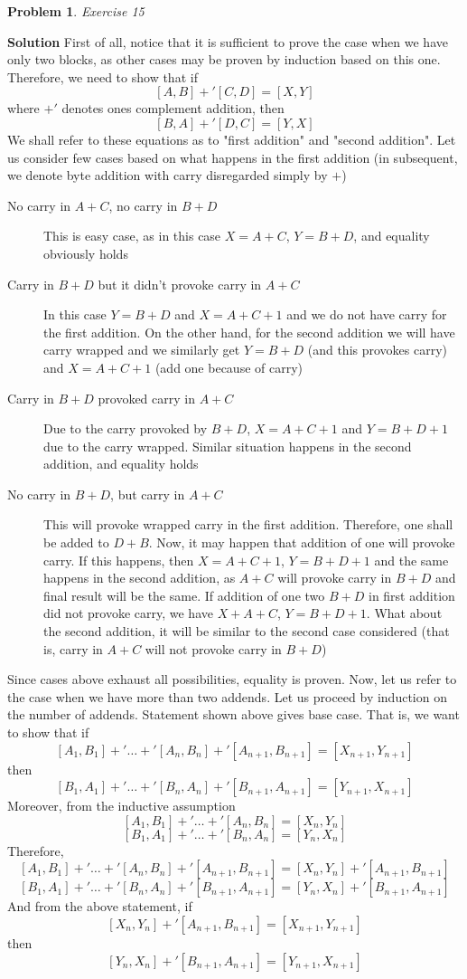 \documentclass[11pt]{article} %
\newtheorem{prob}{Problem}
\newenvironment{solution}%
{\par\textbf{Solution}\space }%
{\par}
\begin{document}
\begin{prob}
	Exercise 15
\end{prob}
\begin{solution}
	First of all, notice that it is sufficient to prove the case when we have only two blocks, as other cases may be proven by induction
	based on this one. Therefore, we need to show that if
	\[[A,B]+'[C,D]=[X,Y]\]
	where $+'$ denotes ones complement addition, then
	\[[B,A]+'[D,C]=[Y,X]\]
	We shall refer to these equations as to "first addition" and "second addition".
	Let us consider few cases based on what happens in the first addition
	(in subsequent, we denote byte addition with carry disregarded simply by $+$)
	\begin{description}
		\item[No carry in $A+C$, no carry in $B+D$]{This is easy case, as in this case $X=A+C$, $Y=B+D$, and equality obviously
			holds}
		\item[Carry in $B+D$ but it didn't provoke carry in $A+C$]{In this case $Y=B+D$ and $X=A+C+1$ and we do not have carry for the
			first addition. On the other hand, for the second addition we will have carry wrapped and we similarly get $Y=B+D$ (and
			this provokes carry) and $X=A+C+1$ (add one because of carry)}
		\item[Carry in $B+D$ provoked carry in $A+C$]{Due to the carry provoked by $B+D$, $X=A+C+1$ and $Y=B+D+1$ due to the carry wrapped.
			Similar situation happens in the second addition, and equality holds}
		\item[No carry in $B+D$, but carry in $A+C$]{This will provoke wrapped carry in the first addition. Therefore, one shall be added
			to $D+B$. Now, it may happen that addition of one will provoke carry. If this happens, then $X=A+C+1$, $Y=B+D+1$ and 
			the same happens in the second addition, as $A+C$ will provoke carry in $B+D$ and final result will be the same.
			If addition of one two $B+D$ in first addition did not provoke carry, we have $X+A+C$, $Y=B+D+1$. What about the second
			addition, it will be similar to the second case considered (that is, carry in $A+C$ will not provoke carry in $B+D$)}
	\end{description}
	Since cases above exhaust all possibilities, equality is proven. Now, let us refer to the case when we have more than two addends. Let
	us proceed by induction on the number of addends. Statement shown above gives base case. That is, we want to show that if
	\[[A_1,B_1]+'\dots+'[A_n,B_n]+'[A_{n+1},B_{n+1}]=[X_{n+1},Y_{n+1}]\]
	then
	\[[B_1,A_1]+'\dots+'[B_n,A_n]+'[B_{n+1},A_{n+1}]=[Y_{n+1},X_{n+1}]\]
	Moreover, from the inductive assumption
	\[[A_1,B_1]+'\dots+'[A_n,B_n]=[X_{n},Y_{n}]\]
	\[[B_1,A_1]+'\dots+'[B_n,A_n]=[Y_{n},X_{n}]\]
	Therefore,
	\[[A_1,B_1]+'\dots+'[A_n,B_n]+'[A_{n+1},B_{n+1}]=[X_n,Y_n]+'[A_{n+1},B_{n+1}]\]
	\[[B_1,A_1]+'\dots+'[B_n,A_n]+'[B_{n+1},A_{n+1}]=[Y_{n},X_{n}]+'[B_{n+1},A_{n+1}]\]
	And from the above statement, if
	\[[X_n,Y_n]+'[A_{n+1},B_{n+1}]=[X_{n+1},Y_{n+1}]\]
	then
	\[[Y_n,X_n]+'[B_{n+1},A_{n+1}]=[Y_{n+1},X_{n+1}]\]
\end{solution}
\end{document}
